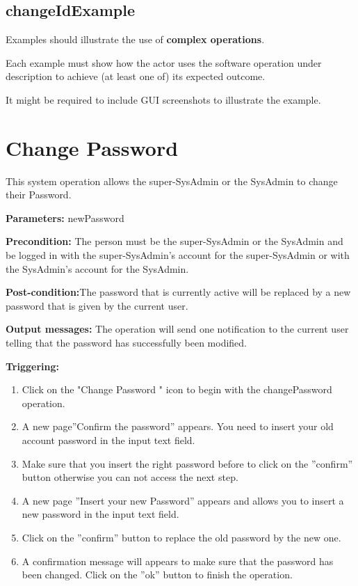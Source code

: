  
\subsection{changeIdExample}
Examples should illustrate the use of \textbf{complex operations}.

Each example must show how the actor uses the software operation under
description to achieve (at least one of) its expected outcome.

It might be required to include GUI screenshots to illustrate the example.



\section{Change Password}
\label{operation:changePassword}
This system operation allows the super-SysAdmin or the SysAdmin to change
their Password.

\begin{description}

\item \textbf{Parameters:} newPassword
\item \textbf{Precondition:} The person must be the super-SysAdmin or the
SysAdmin and be logged in with the super-SysAdmin's account for the
super-SysAdmin or with the SysAdmin's account for the SysAdmin.
\item \textbf{Post-condition:}The password that is currently active will be
replaced by a new password that is given by the current user.
\item \textbf{Output messages:} The operation will send one notification to the
current user telling that the password  has successfully been modified.


\item \textbf{Triggering:}
\begin{enumerate}
\item Click on the "Change Password " icon to begin with the changePassword
operation.
\item A new page''Confirm the password'' appears. You need to insert your old
account password in the input text field. 
\item Make sure that you insert the right password before to click on the
''confirm'' button otherwise you can not access the next step.
\item A new page ''Insert your new Password'' appears and allows you to
insert a new password in the input text field.
\item Click on the ''confirm'' button to replace the old password by the new
one.
\item A confirmation message will appears to make sure that the password
has been changed. Click on the ''ok'' button to finish the operation.
\end{enumerate}

 
\end{description}

